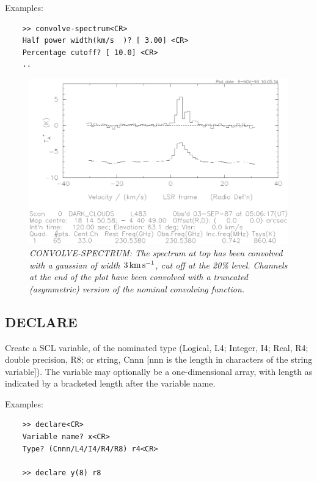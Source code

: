 \documentclass[11pt,twoside]{report}
\begin{document}
Examples:
\begin{verbatim}
    >> convolve-spectrum<CR>
    Half power width(km/s  )? [ 3.00] <CR>
    Percentage cutoff? [ 10.0] <CR>
    ..
\end{verbatim}

\begin{figure}[htbp]
\begin{center}
\includegraphics[scale=0.65]{convolve.ps}
\protect\parbox{5.5in}
{\caption[CONVOLVE]
{\sl
CONVOLVE-SPECTRUM: The spectrum at top has been convolved with a gaussian
of width $3{\rm\,km\,s^{-1}}$, cut off at the 20\% level. Channels at the end of the 
plot have been convolved with a truncated (asymmetric) version of the 
nominal convolving function.
\label{CONVOLVE}
}
}
\end{center}
\end{figure}

\subsection{DECLARE}  

Create a SCL variable, of the nominated type (Logical, L4; Integer, I4;
Real, R4; double precision, R8; or string, Cnnn [nnn is the length in characters
of the string variable]). The variable may 
optionally be a one-dimensional array, with length as indicated by a
bracketed length after the variable name.

Examples:
\begin{verbatim}
    >> declare<CR>
    Variable name? x<CR>
    Type? (Cnnn/L4/I4/R4/R8) r4<CR>

    >> declare y(8) r8
\end{verbatim}
\end{document}
